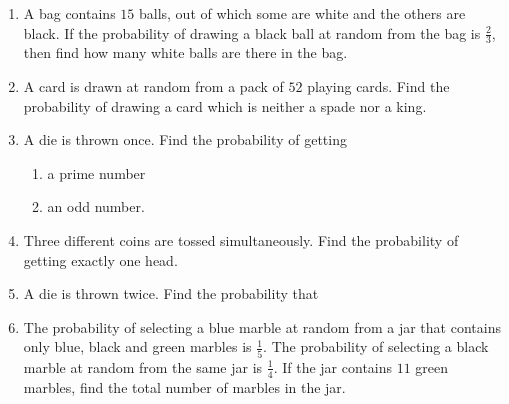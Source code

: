\begin{enumerate}
\item A bag contains $15$ balls, out of which some are white and the others are black. If the probability of drawing a black ball at random from the bag is $\frac{2}{3}$, then find how many white balls are there in the bag.

\item A card is drawn at random from a pack of $52$ playing cards. Find the probability of drawing a card which is neither a spade nor a king.

\item A die is thrown once. Find the probability of getting
\begin{enumerate}
    \item a prime number
    \item an odd number. 
\end{enumerate}

\item Three different coins are tossed simultaneously. Find the probability of getting exactly one head.

\item A die is thrown twice. Find the probability that
\begin{enumerate}
\end{enumerate}

\item The probability of selecting a blue marble at random from a jar that contains only blue, black and green marbles is $\frac{1}{5}$. The probability of selecting a black marble at random from the same jar is $\frac{1}{4}$. If the jar contains $11$ green marbles, find the total number of marbles in the jar.

\end{enumerate}
